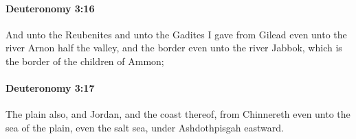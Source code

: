 		\paragraph{Deuteronomy 3:16} %
			\label{DEUTERONOMY-3-16}

			And unto the Reubenites and unto the Gadites I gave from Gilead even unto the river Arnon half the valley, and the border even unto the river Jabbok, which is the border of the children of Ammon;


		\paragraph{Deuteronomy 3:17} %
			\label{DEUTERONOMY-3-17}

			The plain also, and Jordan, and the coast thereof, from Chinnereth even unto the sea of the plain, even the salt sea, under Ashdothpisgah eastward.



